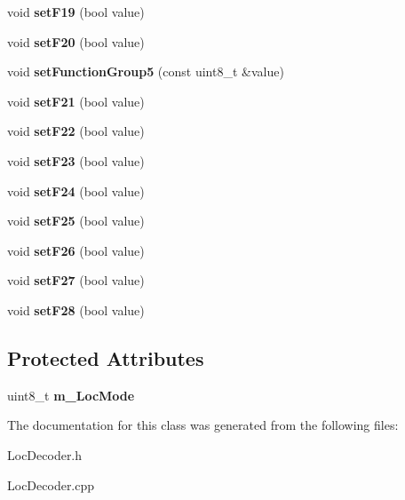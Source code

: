 \begin{DoxyCompactItemize}
void {\bfseries set\+F19} (bool value)
\item 
\mbox{\label{classTBT_1_1LocDecoder_a04a0514ad5b63714ca5774cf3c2e277c}} 
void {\bfseries set\+F20} (bool value)
\item 
\mbox{\label{classTBT_1_1LocDecoder_a30659350a469bda322d276ee17b1b89c}} 
void {\bfseries set\+Function\+Group5} (const uint8\+\_\+t \&value)
\item 
\mbox{\label{classTBT_1_1LocDecoder_ab5d79049ab7e38b4d408c9627db99a6d}} 
void {\bfseries set\+F21} (bool value)
\item 
\mbox{\label{classTBT_1_1LocDecoder_a7dc0125781c063f15dda51d03ec3e25d}} 
void {\bfseries set\+F22} (bool value)
\item 
\mbox{\label{classTBT_1_1LocDecoder_a7b5a668ba542b1d8a8b47064be1f5c5a}} 
void {\bfseries set\+F23} (bool value)
\item 
\mbox{\label{classTBT_1_1LocDecoder_a3c44b57443b1d600380ccf8e55da23e5}} 
void {\bfseries set\+F24} (bool value)
\item 
\mbox{\label{classTBT_1_1LocDecoder_aafefc743964ea0b01ff3ad51fee98033}} 
void {\bfseries set\+F25} (bool value)
\item 
\mbox{\label{classTBT_1_1LocDecoder_a646c6edc6515dadaebac9b06a0907a9e}} 
void {\bfseries set\+F26} (bool value)
\item 
\mbox{\label{classTBT_1_1LocDecoder_a7584ffb3eaf00b83b48217081049ff59}} 
void {\bfseries set\+F27} (bool value)
\item 
\mbox{\label{classTBT_1_1LocDecoder_a66c6f1dcd471f19d019018ed3eed2e0f}} 
void {\bfseries set\+F28} (bool value)
\end{DoxyCompactItemize}
\subsection*{Protected Attributes}
\begin{DoxyCompactItemize}
\item 
\mbox{\label{classTBT_1_1LocDecoder_a196fc5289b1ea2c9439b385770692c92}} 
uint8\+\_\+t {\bfseries m\+\_\+\+Loc\+Mode}
\end{DoxyCompactItemize}


The documentation for this class was generated from the following files\+:\begin{DoxyCompactItemize}
\item 
Loc\+Decoder.\+h\item 
Loc\+Decoder.\+cpp\end{DoxyCompactItemize}
